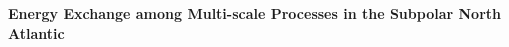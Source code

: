 \begin{titlepage}

    \vskip50pt
    \par\vskip20pt
    
    \begin{center}
    
    \begin{spacing}{1.5}
    \par\vskip30pt
    
    {\bfseries\textrm Energy Exchange among Multi-scale Processes in the Subpolar North Atlantic}
    \end{spacing}
    

\end{center}
\end{titlepage}
